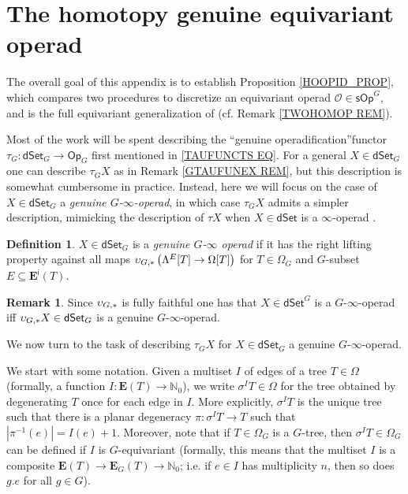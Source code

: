 \documentclass[a4paper,10pt
,draft
]{article}%
\numberwithin{equation}{section}
\numberwithin{figure}{section}
\theoremstyle{definition} %
\newtheorem{definition}[equation]{Definition}%
\newtheorem{remark}[equation]{Remark}%
\renewcommand{\O}{\ensuremath{\mathcal O}}
\newcommand{\1}{\ensuremath{\mathbbm 1}}%
\begin{document}
\section{The homotopy genuine equivariant operad}
\label{HGEO AP}


The overall goal of this appendix is to establish
Proposition \ref{HOOPID_PROP},
which compares two procedures to discretize an
equivariant operad $\O \in \mathsf{sOp}^G$,
and is the full equivariant generalization of
\cite[Prop. 4.8]{CM13b}
(cf. Remark \ref{TWOHOMOP REM}).

Most of the work will be spent 
describing the ``genuine operadification''functor
$\tau_G \colon \mathsf{dSet}_G \to \mathsf{Op}_G$
first mentioned in
\eqref{TAUFUNCTS EQ}.
For a general $X \in \mathsf{dSet}_G$
one can describe $\tau_G X$
as in Remark \ref{GTAUFUNEX REM},
but this description is somewhat cumbersome in practice.
Instead, here we will focus on the case of
$X \in \mathsf{dSet}_G$
a \emph{genuine $G$-$\infty$-operad}, 
in which case $\tau_G X$
admits a simpler description,
mimicking the description
of $\tau X$ when $X\in \mathsf{dSet}$
is a $\infty$-operad \cite[\S 6]{MW09}.


\begin{definition}
$X \in \mathsf{dSet}_G$
is a \emph{genuine $G$-$\infty$ operad}
if it has the right lifting property against all maps
$\upsilon_{G,\**} 
\left(\Lambda^E[T] \to \Omega[T]\right)$
for $T \in \Omega_G$
and $G$-subset
$E \subseteq \boldsymbol{E}^{\mathsf{i}}(T)$.
\end{definition}

\begin{remark}
	Since $\upsilon_{G,\**}$
	is fully faithful
	one has that 
	$X \in \mathsf{dSet}^G$
	is a $G$-$\infty$-operad
	iff
	$\upsilon_{G,\**}X \in \mathsf{dSet}_G$
	is a genuine $G$-$\infty$-operad.
\end{remark}

We now turn to the task of describing
$\tau_G X$ for $X \in \mathsf{dSet}_G$
a genuine $G$-$\infty$-operad.

We start with some notation. 
Given a multiset $I$ of edges of a tree $T \in \Omega$
(formally, a function 
$I \colon \boldsymbol{E}(T) \to \mathbb{N}_0$),
we write $\sigma^I T \in \Omega$
for the tree obtained by degenerating $T$ once for each edge in $I$.
More explicitly, $\sigma^I T$ is the unique tree such that there is a planar degeneracy
$\pi \colon \sigma^I T \to T$
such that $|\pi^{-1}(e)| = I(e) + 1$.
Moreover,
note that if $T\in \Omega_G$ is a $G$-tree, 
then $\sigma^{I} T \in \Omega_{G}$
can be defined if $I$ is $G$-equivariant
(formally, this means that the multiset $I$ is a composite
$\boldsymbol{E}(T) \to \boldsymbol{E}_G(T)
\to \mathbb{N}_0$;
i.e. if $e \in I$ has multiplicity $n$, then so does $ g.e$ for all $g \in G$).
\end{document}
